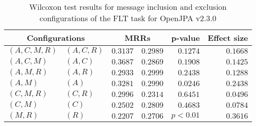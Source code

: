
\begin{table}
\begin{spacing}{1.2}
\centering
\caption{Wilcoxon test results for message inclusion and exclusion configurations of the FLT task for OpenJPA v2.3.0}
\label{table:versus-wilcox-openjpa-flt-message}
\begin{tabular}{ll|rr|rr}
\toprule
      \multicolumn{2}{c|}{Configurations} &          \multicolumn{2}{c|}{MRRs} &       p-value & Effect size \\
\midrule
 $(A,C,M,R)$ &  $(A,C,R)$ & $0.3137$ & $0.2989$ & $0.1274$ &    $0.1668$ \\
   $(A,C,M)$ &    $(A,C)$ & $0.3687$ & $0.2869$ & $0.1908$ &    $0.1425$ \\
   $(A,M,R)$ &    $(A,R)$ & $0.2933$ & $0.2999$ & $0.2438$ &    $0.1288$ \\
     $(A,M)$ &      $(A)$ & $0.3281$ & $0.2990$ & $0.0246$ &    $0.2438$ \\
   $(C,M,R)$ &    $(C,R)$ & $0.2996$ & $0.2314$ & $0.6451$ &    $0.0496$ \\
     $(C,M)$ &      $(C)$ & $0.2502$ & $0.2809$ & $0.4683$ &    $0.0784$ \\
     $(M,R)$ &      $(R)$ & $0.2207$ & $0.2706$ & $p<0.01$ &    $0.3616$ \\
\bottomrule
\end{tabular}

\end{spacing}
\end{table}

